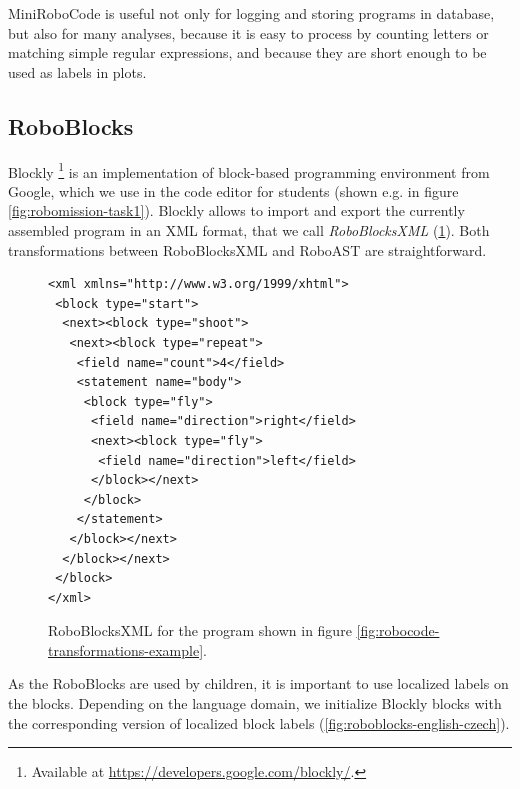 MiniRoboCode is useful not only for logging and storing programs in database,
but also for many analyses, because it is easy to process by counting
letters or matching simple regular expressions, and because they are short
enough to be used as labels in plots.


\subsection{RoboBlocks}

Blockly%
\footnote{Available at \url{https://developers.google.com/blockly/}.}
is an implementation of block-based programming
environment from Google,
which we use in the code editor for students
(shown e.g. in figure \ref{fig:robomission-task1}).
Blockly allows to import and export the currently assembled program in
an XML format, that we call \emph{RoboBlocksXML}
(\cref{fig:roboblocks-xml}).
Both transformations between RoboBlocksXML and RoboAST are straightforward.


\begin{figure}[h]
\begin{lstlisting}[basicstyle=\small\ttfamily]
<xml xmlns="http://www.w3.org/1999/xhtml">
 <block type="start">
  <next><block type="shoot">
   <next><block type="repeat">
    <field name="count">4</field>
    <statement name="body">
     <block type="fly">
      <field name="direction">right</field>
      <next><block type="fly">
       <field name="direction">left</field>
      </block></next>
     </block>
    </statement>
   </block></next>
  </block></next>
 </block>
</xml>
\end{lstlisting}
  \caption{%
    RoboBlocksXML for the program shown in figure %
    \ref{fig:robocode-transformations-example}.}
\label{fig:roboblocks-xml}
\end{figure}

As the RoboBlocks are used by children, it is important to use localized labels
on the blocks.
Depending on the language domain, we initialize Blockly blocks with the corresponding
version of localized block labels
(\cref{fig:roboblocks-english-czech}).

